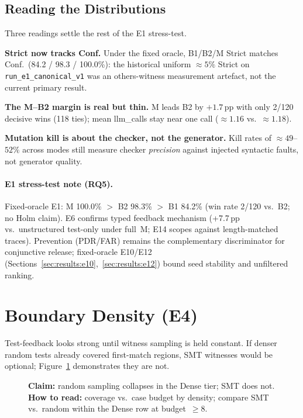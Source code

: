 \subsection{Reading the Distributions}

Three readings settle the rest of the E1 stress-test.

\textbf{Strict now tracks Conf.}
Under the fixed oracle, B1/B2/M Strict matches Conf.\ (84.2 / 98.3 /
100.0\%): the historical uniform ${\approx}5\%$ Strict on
\texttt{run\_e1\_canonical\_v1} was an others-witness measurement artefact,
not the current primary result.

\textbf{The M--B2 margin is real but thin.}
M leads B2 by ${+}1.7$\,pp with only 2/120 decisive wins (118 ties);
mean llm\_calls stay near one call (${\approx}1.16$ vs.\ ${\approx}1.18$).

\textbf{Mutation kill is about the checker, not the generator.}
Kill rates of ${\approx}49$--$52\%$ across modes still measure checker
\emph{precision} against injected syntactic faults, not generator quality.

\paragraph{E1 stress-test note (RQ5).}
Fixed-oracle E1: M 100.0\% $>$ B2 98.3\% $>$ B1 84.2\% (win rate 2/120 vs.\ B2;
no Holm claim).
E6 confirms typed feedback mechanism (+7.7\,pp vs.\ unstructured test-only
under full~M; E14 scopes against length-matched traces).
Prevention (PDR/FAR) remains the complementary discriminator for conjunctive
release; fixed-oracle E10/E12 (Sections~\ref{sec:results:e10},~\ref{sec:results:e12})
bound seed stability and unfiltered ranking.

\section{Boundary Density (E4)}
\label{sec:results:e4}

Test-feedback looks strong until witness sampling is held constant.
If denser random tests already covered first-match regions, SMT witnesses
would be optional; Figure~\ref{fig:boundary} demonstrates they are not.

\begin{figure}[t]
  \centering
  \caption{\textbf{Claim:} random sampling collapses in the Dense tier; SMT
    does not.
    \textbf{How to read:} coverage vs.\ case budget by density; compare SMT
    vs.\ random within the Dense row at budget~$\ge 8$.}
  \label{fig:boundary}
\end{figure}

